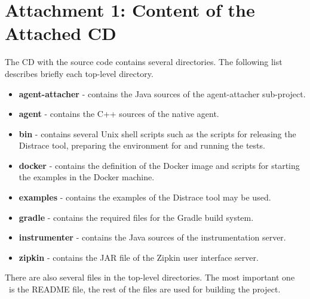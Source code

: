 \chapter*{Attachment 1: Content of the Attached CD}
The CD with the source code contains several directories. The following list describes briefly each top-level directory.
\begin{itemize}
	\item \textbf{agent-attacher} - contains the Java sources of the agent-attacher sub-project.
	\item \textbf{agent} - contains the C++ sources of the native agent.
	\item \textbf{bin} - contains several Unix shell scripts such as the scripts for releasing the Distrace tool, preparing the environment for and running the tests.
	\item \textbf{docker} - contains the definition of the Docker image and scripts for starting the examples in the Docker machine.
	\item \textbf{examples} - contains the examples of the Distrace tool may be used.
	\item \textbf{gradle} - contains the required files for the Gradle build system.
	\item \textbf{instrumenter} - contains the Java sources of the instrumentation server.
	\item \textbf{zipkin} - contains the JAR file of the Zipkin user interface server.
\end{itemize}
 There are also several files in the top-level directories. The most important one  ~is the README file, the rest of the files are used for building the project.